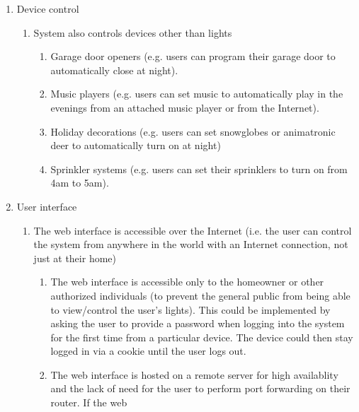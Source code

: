 \documentclass[12pt]{article}
\begin{document}
\begin{enumerate}[resume]
    \item Device control
        \begin{enumerate}
            \item System also controls devices other than lights
                \begin{enumerate}
                    \item Garage door openers (e.g. users can program their
                        garage door to automatically close at night).
                    \item Music players (e.g. users can set music to
                        automatically play in the evenings from an attached
                        music player or from the Internet).
                    \item Holiday decorations (e.g. users can set snowglobes or
                        animatronic deer to automatically turn on at night)
                    \item Sprinkler systems (e.g. users can set their
                        sprinklers to turn on from 4am to 5am).
                \end{enumerate}
        \end{enumerate}
    \item User interface
        \begin{enumerate}
            \item The web interface is accessible over the Internet (i.e. the
                user can control the system from anywhere in the world with an
                Internet connection, not just at their home)
                \begin{enumerate}
                    \item The web interface is accessible only to the homeowner
                        or other authorized individuals (to prevent the general
                        public from being able to view/control the user's
                        lights).  This could be implemented by asking the user
                        to provide a password when logging into the system for
                        the first time from a particular device.  The device
                        could then stay logged in via a cookie until the user
                        logs out.
                    \item The web interface is hosted on a remote server for
                        high availablity and the lack of need for the user to
                        perform port forwarding on their router.  If the web

\end{enumerate}
\end{enumerate}
\end{enumerate}
\end{document}
